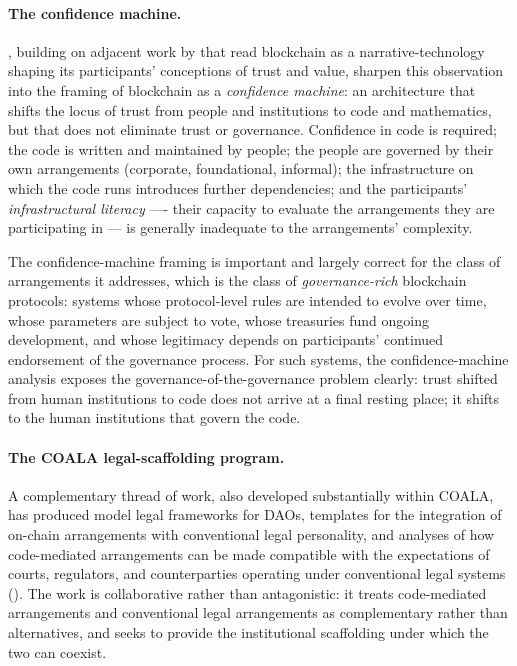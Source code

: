\documentclass[11pt,a4paper]{article}
\theoremstyle{remark}
\begin{document}
\paragraph{The confidence machine.}
\citet{defilippi_mannan_reijers_2022}, building on adjacent work
by \citet{reijers_coeckelbergh_2018} that read blockchain as a
narrative-technology shaping its participants' conceptions of
trust and value, sharpen this observation
into the framing of blockchain as a \emph{confidence machine}:
an architecture that shifts the locus of trust from people and
institutions to code and mathematics, but that does not
eliminate trust or governance. Confidence in code is required;
the code is written and maintained by people; the people are
governed by their own arrangements (corporate, foundational,
informal); the infrastructure on which the code runs introduces
further dependencies; and the participants' \emph{infrastructural
literacy} ---- their capacity to evaluate the arrangements they
are participating in --- is generally inadequate to the
arrangements' complexity.

The confidence-machine framing is important and largely correct
for the class of arrangements it addresses, which is the class
of \emph{governance-rich} blockchain protocols: systems whose
protocol-level rules are intended to evolve over time, whose
parameters are subject to vote, whose treasuries fund ongoing
development, and whose legitimacy depends on participants'
continued endorsement of the governance process. For such
systems, the confidence-machine analysis exposes the
governance-of-the-governance problem clearly: trust shifted from
human institutions to code does not arrive at a final resting
place; it shifts to the human institutions that govern the code.

\paragraph{The COALA legal-scaffolding program.}
A complementary thread of work, also developed substantially
within COALA, has produced model legal frameworks for DAOs,
templates for the integration of on-chain arrangements with
conventional legal personality, and analyses of how
code-mediated arrangements can be made compatible with the
expectations of courts, regulators, and counterparties operating
under conventional legal systems
(\citealt{defilippi_hassan_2016}). The work is collaborative
rather than antagonistic: it treats code-mediated arrangements
and conventional legal arrangements as complementary rather
than alternatives, and seeks to provide the institutional
scaffolding under which the two can coexist.
\end{document}
